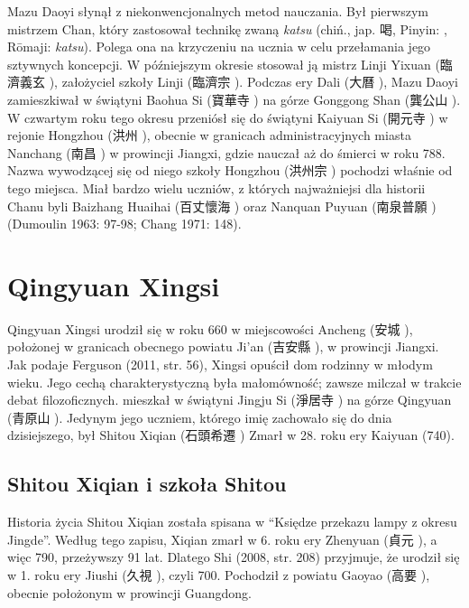 Mazu Daoyi słynął z niekonwencjonalnych metod nauczania.
Był pierwszym mistrzem Chan, który zastosował technikę zwaną \textit{katsu} (chiń., jap. 喝, Pinyin: , Rōmaji: \textit{katsu}).
Polega ona na krzyczeniu na ucznia w celu przełamania jego sztywnych koncepcji.
W późniejszym okresie stosował ją mistrz Linji Yixuan (臨濟義玄 ), założyciel szkoły Linji (臨濟宗 ). %
Podczas ery Dali (大曆 ), Mazu Daoyi zamieszkiwał w świątyni Baohua Si (寶華寺 ) na górze Gonggong Shan (龔公山 ).
W czwartym roku tego okresu przeniósł się do świątyni Kaiyuan Si (開元寺 ) w rejonie Hongzhou (洪州 ), obecnie w granicach administracyjnych miasta Nanchang (南昌 ) w prowincji Jiangxi, gdzie nauczał aż do śmierci w roku 788.
Nazwa wywodzącej się od niego szkoły Hongzhou (洪州宗 ) pochodzi właśnie od tego miejsca.
Miał bardzo wielu uczniów, z których najważniejsi dla historii Chanu byli Baizhang Huaihai (百丈懷海 ) oraz Nanquan Puyuan (南泉普願 )
(Dumoulin 1963: 97-98; Chang 1971: 148).

\section{Qingyuan Xingsi}
Qingyuan Xingsi urodził się w roku 660 w miejscowości Ancheng (安城 ), położonej w granicach obecnego powiatu Ji'an (吉安縣 ), w prowincji Jiangxi.
Jak podaje Ferguson (2011, str. 56), Xingsi opuścił dom rodzinny w młodym wieku.
Jego cechą charakterystyczną była małomówność; zawsze milczał w trakcie debat filozoficznych.
mieszkał w świątyni Jingju Si (淨居寺 ) na górze Qingyuan (青原山 ).
Jedynym jego uczniem, którego imię zachowało się do dnia dzisiejszego, był Shitou Xiqian (石頭希遷 )
Zmarł w 28. roku ery Kaiyuan (740).

\subsection{Shitou Xiqian i szkoła Shitou}
Historia życia Shitou Xiqian została spisana w ``Księdze przekazu lampy z okresu Jingde''.
Według tego zapisu, Xiqian zmarł w 6. roku ery Zhenyuan (貞元 ), a więc 790, przeżywszy 91 lat.
Dlatego Shi (2008, str. 208) przyjmuje, że urodził się w 1. roku ery Jiushi (久視 ), czyli 700.
Pochodził z powiatu Gaoyao (高要 ), obecnie położonym w prowincji Guangdong.

